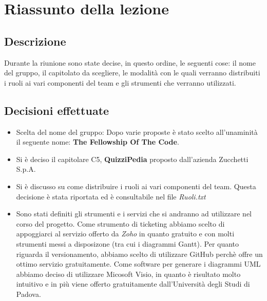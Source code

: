 \chapter{Riassunto della lezione}
\section{Descrizione}

Durante la riunione sono state decise, in questo ordine, le seguenti cose: il nome del gruppo, il capitolato da scegliere, le modalità con le quali verranno distribuiti i ruoli ai vari componenti del team e gli strumenti che verranno utilizzati.

\section{Decisioni effettuate}
\begin{itemize}
\item Scelta del nome del gruppo: Dopo varie proposte è stato scelto all'unaminità il seguente nome: \textbf{The Fellowship Of The Code}.
\item Si è deciso il capitolare C5, \textbf{QuizziPedia} proposto dall'azienda Zucchetti S.p.A.
\item Si è discusso su come distribuire i ruoli ai vari componenti del team. Questa decisione è stata riportata ed è consultabile nel file \textsl{Ruoli.txt}
\item Sono stati definiti gli strumenti e i servizi che si andranno ad utilizzare nel corso del progetto. Come strumento di ticketing abbiamo scelto di appoggiarci al servizio offerto da \textsl{Zoho} in quanto gratuito e con molti strumenti messi a disposizone (tra cui i diagrammi Gantt). Per quanto riguarda il versionamento, abbiamo scelto di utilizzare GitHub perchè offre un ottimo servizio gratuitamente. Come software per generare i diagrammi UML abbiamo deciso di utilizzare Micosoft Visio, in quanto è risultato molto intuitivo e in più viene offerto gratuitamente dall'Università degli Studi di Padova.
\end{itemize}